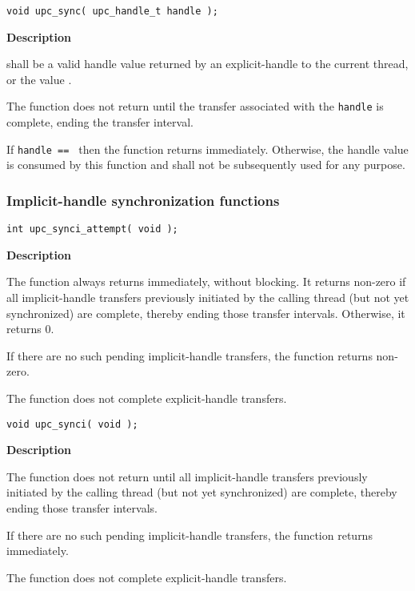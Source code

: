 \def\bfunc{upc\_sync}
\funcheader

\begin{verbatim}
void upc_sync( upc_handle_t handle );
\end{verbatim}

{\bf Description}

 shall be a valid handle value returned by
an explicit-handle \TIF to the current thread, or the value \complete.

\np The \func function does not return until the transfer associated
with the {\tt handle} is complete, ending the transfer interval.

\np If {\tt handle == \complete} then the \func function returns immediately.
Otherwise, the handle value is consumed by this function and shall not be 
subsequently used for any purpose.

\newpage
\subsubsection{Implicit-handle synchronization functions}
\def\bfunc{upc\_synci\_attempt}
\funcheader

\begin{verbatim}
int upc_synci_attempt( void );
\end{verbatim}

{\bf Description}

\np The \func function always returns immediately, without blocking.
It returns non-zero if all implicit-handle transfers
previously initiated by the calling thread (but not yet synchronized) are complete, 
thereby ending those transfer intervals. Otherwise, it returns 0.

\np If there are no such pending implicit-handle transfers, the function returns non-zero.

\np The \func function does not complete explicit-handle transfers.

\def\bfunc{upc\_synci}
\funcheader

\begin{verbatim}
void upc_synci( void );
\end{verbatim}

{\bf Description}

\np The \func function does not return until all implicit-handle transfers
previously initiated by the calling thread (but not yet synchronized) are complete, 
thereby ending those transfer intervals.

\np If there are no such pending implicit-handle transfers, the function returns immediately.

\np The \func function does not complete explicit-handle transfers.

